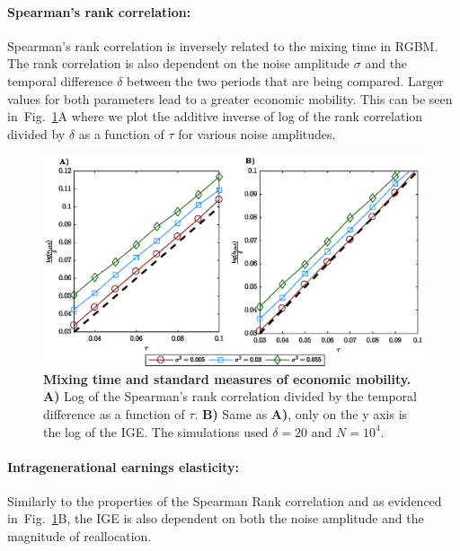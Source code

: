 \documentclass[11pt]{article}
\newcommand{\fref}[1]{Fig.~\ref{fig:#1}}
\numberwithin{equation}{section}
\begin{document}
\paragraph{Spearman's rank correlation:} Spearman's rank correlation is inversely related to the mixing time in RGBM. The rank correlation is also dependent on the noise amplitude $\sigma$ and the temporal difference $\delta$ between the two periods that are being compared. Larger values for both parameters lead to a greater economic mobility. This can be seen in~\fref{rgbm-standard-measures}A where we plot the additive inverse of log of the rank correlation divided by $\delta$ as a function of $\tau$ for various noise amplitudes.

\begin{figure}[!htb]
\centering
\includegraphics[width=1.0\textwidth]{figs/fig_rgbm_standard_measures.eps}
\caption{\textbf{Mixing time and standard measures of economic mobility.} \textbf{A)} Log of the Spearman's rank correlation divided by the temporal difference as a function of $\tau$. \textbf{B)} Same as \textbf{A)}, only on the y axis is the log of the IGE. The simulations used $\delta = 20$ and $N = 10^4$.
\label{fig:rgbm-standard-measures}}
\end{figure}

\paragraph{Intragenerational earnings elasticity:} Similarly to the properties of the Spearman Rank correlation and as evidenced in~\fref{rgbm-standard-measures}B, the IGE is also dependent on both the noise amplitude and the magnitude of reallocation.
\end{document}
